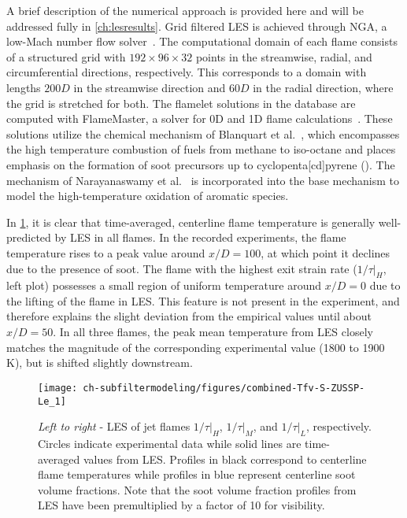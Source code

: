 A brief description of the numerical approach is provided here and will be addressed fully in \cref{ch:lesresults}. Grid filtered LES is achieved through NGA, a low-Mach number flow solver~\cite{desjardins2008}. The computational domain of each flame consists of a structured grid with $192 \times 96 \times 32$ points in the streamwise, radial, and circumferential directions, respectively. This corresponds to a domain with lengths $200D$ in the streamwise direction and $60D$ in the radial direction, where the grid is stretched for both. The flamelet solutions in the database are computed with FlameMaster, a solver for 0D and 1D flame calculations~\cite{flamemaster}. These solutions utilize the chemical mechanism of Blanquart et al.~\cite{blanquart2009588}, which encompasses the high temperature combustion of fuels from methane to iso-octane and places emphasis on the formation of soot precursors up to cyclopenta[cd]pyrene (). The mechanism of Narayanaswamy et al.~\cite{narayanaswamy2010} is incorporated into the base mechanism to model the high-temperature oxidation of aromatic species.

In \cref{fig:subfilter:leszussp:zusspleseval}, it is clear that time-averaged, centerline flame temperature is generally well-predicted by LES in all flames. In the recorded experiments, the flame temperature rises to a peak value around $x/D = 100$, at which point it declines due to the presence of soot. The flame with the highest exit strain rate ($1/\tau|_H$, left plot) possesses a small region of uniform temperature around $x/D = 0$ due to the lifting of the flame in LES. This feature is not present in the experiment, and therefore explains the slight deviation from the empirical values until about $x/D = 50$. In all three flames, the peak mean temperature from LES closely matches the magnitude of the corresponding experimental value (1800 to 1900 K), but is shifted slightly downstream.

\begin{figure}[htb]
  \begin{center}
    \texttt{[image: ch-subfiltermodeling/figures/combined-Tfv-S-ZUSSP-Le\_1]}
    \caption[LES Validation of \texorpdfstring{$Z$}{Z}-Uniform Soot Subfilter PDF]{\textit{Left to right} - LES of jet flames $1/\tau|_H$, $1/\tau|_M$, and $1/\tau|_L$, respectively. Circles indicate experimental data while solid lines are time-averaged values from LES. Profiles in black correspond to centerline flame temperatures while profiles in blue represent centerline soot volume fractions. Note that the soot volume fraction profiles from LES have been premultiplied by a factor of 10 for visibility.}
    \label{fig:subfilter:leszussp:zusspleseval}
  \end{center}
\end{figure}

